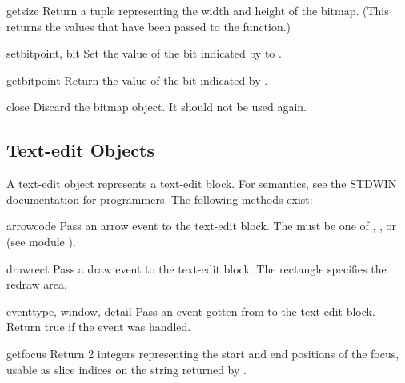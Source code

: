 \begin{methoddesc}[bitmap]{getsize}{}
Return a tuple representing the width and height of the bitmap.
(This returns the values that have been passed to the
 function.)
\end{methoddesc}

\begin{methoddesc}[bitmap]{setbit}{point, bit}
Set the value of the bit indicated by  to .
\end{methoddesc}

\begin{methoddesc}[bitmap]{getbit}{point}
Return the value of the bit indicated by .
\end{methoddesc}

\begin{methoddesc}[bitmap]{close}{}
Discard the bitmap object.  It should not be used again.
\end{methoddesc}

\subsection{Text-edit Objects}

A text-edit object represents a text-edit block.
For semantics, see the STDWIN documentation for \C{} programmers.
The following methods exist:


\begin{methoddesc}{arrow}{code}
Pass an arrow event to the text-edit block.
The  must be one of , , 
 or  (see module
).
\end{methoddesc}

\begin{methoddesc}{draw}{rect}
Pass a draw event to the text-edit block.
The rectangle specifies the redraw area.
\end{methoddesc}

\begin{methoddesc}{event}{type, window, detail}
Pass an event gotten from
to the text-edit block.
Return true if the event was handled.
\end{methoddesc}

\begin{methoddesc}{getfocus}{}
Return 2 integers representing the start and end positions of the
focus, usable as slice indices on the string returned by
.
\end{methoddesc}

